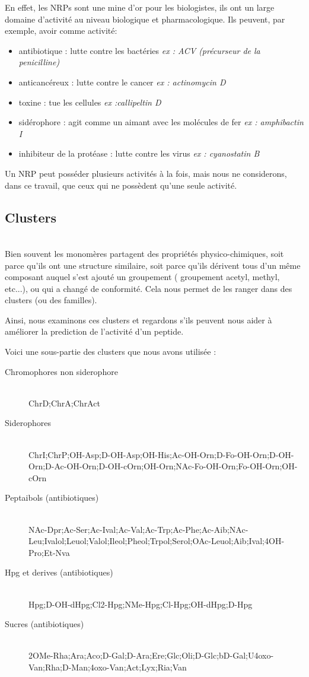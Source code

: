 \documentclass[a4paper,10pt]{report}
\begin{document}
	En effet, les NRPs sont une mine d'or pour les biologistes, ils ont un large domaine d'activité au niveau biologique et pharmacologique. 
	Ils peuvent, par exemple, avoir comme activité:
	\begin{itemize}
	 \item antibiotique : lutte contre les bactéries \textit{ex : ACV (précurseur de la penicilline)}  
	 \item anticancéreux : lutte contre le cancer \textit{ex : actinomycin D}
	 \item toxine :  tue les cellules \textit{ex :callipeltin D}
	 \item sidérophore : agit comme un aimant avec les molécules de fer \textit{ex : amphibactin I}
	 \item inhibiteur de la protéase : lutte contre les virus \textit{ex : cyanostatin B}
	\end{itemize}
	Un NRP peut posséder plusieurs activités à la fois, mais nous ne considerons, dans ce travail, que ceux qui ne possèdent qu'une seule activité.
       
      \subsection{Clusters}
	
	~\\
	Bien souvent les monomères partagent des propriétés physico-chimiques, soit parce qu'ils ont une structure similaire, soit parce qu'ils dérivent tous d'un même composant auquel s'est ajouté un groupement ( groupement acetyl, methyl, etc...), ou qui a changé de conformité. Cela nous permet de les ranger dans des clusters (ou des familles).
	
	Ainsi, nous examinons ces clusters et regardons s'ils peuvent nous aider à améliorer la prediction de l'activité d'un peptide.
	
	Voici une sous-partie des clusters que nous avons utilisée :
	
	\begin{description}
	 \item[Chromophores non siderophore] \hfill \\ChrD;ChrA;ChrAct
	 \item[Siderophores] \hfill \\ChrI;ChrP;OH-Asp;D-OH-Asp;OH-His;Ac-OH-Orn;D-Fo-OH-Orn;D-OH-Orn;D-Ac-OH-Orn;D-OH-cOrn;OH-Orn;NAc-Fo-OH-Orn;Fo-OH-Orn;OH-cOrn
	 \item[Peptaibols (antibiotiques)]\hfill \\ NAc-Dpr;Ac-Ser;Ac-Ival;Ac-Val;Ac-Trp;Ac-Phe;Ac-Aib;NAc-Leu;Ivalol;Leuol;Valol;Ileol;Pheol;Trpol;Serol;OAc-Leuol;Aib;Ival;4OH-Pro;Et-Nva
	 \item[Hpg et derives (antibiotiques)] \hfill \\Hpg;D-OH-dHpg;Cl2-Hpg;NMe-Hpg;Cl-Hpg;OH-dHpg;D-Hpg
	 \item[Sucres (antibiotiques)] \hfill \\2OMe-Rha;Ara;Aco;D-Gal;D-Ara;Ere;Glc;Oli;D-Glc;bD-Gal;U4oxo-Van;Rha;D-Man;4oxo-Van;Act;Lyx;Ria;Van
	\end{description}
\end{document}
